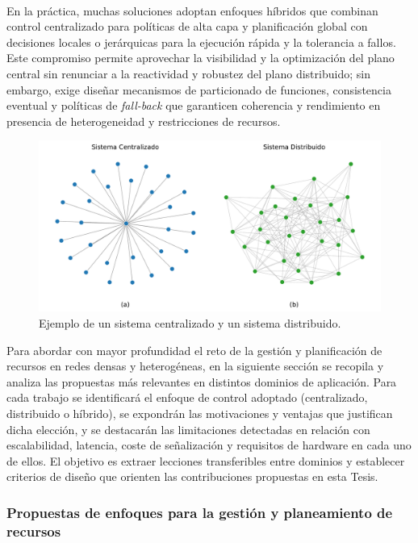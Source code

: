 \\
En la práctica, muchas soluciones adoptan enfoques híbridos que combinan control centralizado para políticas de alta capa y planificación global con decisiones locales o jerárquicas para la ejecución rápida y la tolerancia a fallos. Este compromiso permite aprovechar la visibilidad y la optimización del plano central sin renunciar a la reactividad y robustez del plano distribuido; sin embargo, exige diseñar mecanismos de particionado de funciones, consistencia eventual y políticas de \textit{fall-back} que garanticen coherencia y rendimiento en presencia de heterogeneidad y restricciones de recursos.

\begin{figure}[ht!]
   \centering
   \includegraphics[width=\textwidth]{fig/02_sota/sota_9_redes_centr_dist.pdf}
   \caption{Ejemplo de un sistema centralizado y un sistema distribuido.}
   \label{fig:sota_9_redes_centr_dist}
\end{figure}

Para abordar con mayor profundidad el reto de la gestión y planificación de recursos en redes densas y heterogéneas, en la siguiente sección se recopila y analiza las propuestas más relevantes en distintos dominios de aplicación. Para cada trabajo se identificará el enfoque de control adoptado (centralizado, distribuido o híbrido), se expondrán las motivaciones y ventajas que justifican dicha elección, y se destacarán las limitaciones detectadas en relación con escalabilidad, latencia, coste de señalización y requisitos de hardware en cada uno de ellos. El objetivo es extraer lecciones transferibles entre dominios y establecer criterios de diseño que orienten las contribuciones propuestas en esta Tesis.

\subsubsection{Propuestas de enfoques para la gestión y planeamiento de recursos}
\label{subsubsec:propuestas_recursos}

